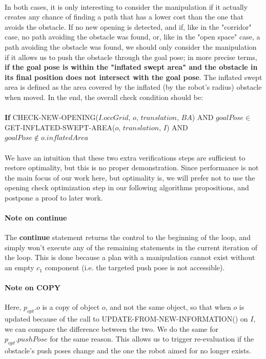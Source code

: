 \paragraph{} In both cases, it is only interesting to consider the manipulation if it actually creates any chance of finding a path that has a lower cost than the one that avoids the obstacle. If no new opening is detected, and if, like in the "corridor" case, no path avoiding the obstacle was found, or, like in the "open space" case, a path avoiding the obstacle was found, we should only consider the manipulation if it allows us to push the obstacle through the goal pose; in more precise terms, \textbf{if the goal pose is within the "inflated swept area" and the obstacle in its final position does not intersect with the goal pose}. The inflated swept area is defined as the area covered by the inflated (by the robot's radius) obstacle when moved. In the end, the overall check condition should be:

\paragraph{} \textbf{If} CHECK-NEW-OPENING($I.occGrid$, $o$, $translation$, $BA$) AND $goalPose \in$ GET-INFLATED-SWEPT-AREA($o$, $translation$, $I$) AND $goalPose \not\in o.inflatedArea$

\paragraph{} We have an intuition that these two extra verifications steps are sufficient to restore optimality, but this is no proper demonstration. Since performance is not the main focus of our work here, but optimality is, we will prefer not to use the opening check optimization step in our following algorithms propositions, and postpone a proof to later work.

\paragraph{Note on \textbf{continue}}\label{continue_note} The \textbf{continue} statement returns the control to the beginning of the loop, and simply won't execute any of the remaining statements in the current iteration of the loop. This is done because a plan with a manipulation cannot exist without an empty $c_{1}$ component (i.e. the targeted push pose is not accessible).

\paragraph{Note on COPY}\label{copy_note} Here, $p_{opt}.o$ is a copy of object $o$, and not the same object, so that when $o$ is updated because of the call to UPDATE-FROM-NEW-INFORMATION() on $I$, we can compare the difference between the two. We do the same for $p_{opt}.pushPose$ for the same reason. This allows us to trigger re-evaluation if the obstacle's push poses change and the one the robot aimed for no longer exists.

